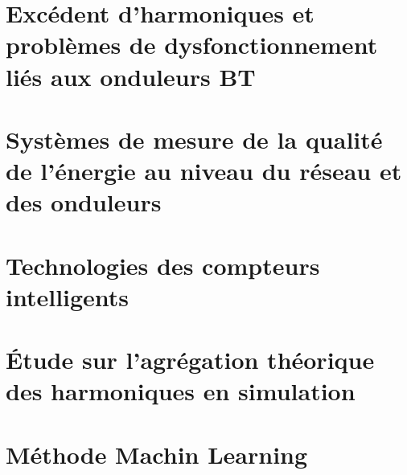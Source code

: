 \section{Excédent d'harmoniques et problèmes de dysfonctionnement liés aux onduleurs BT}



\section{Systèmes de mesure de la qualité de l'énergie au niveau du réseau et des onduleurs}



\section{Technologies des compteurs intelligents}



\section{Étude sur l'agrégation théorique des harmoniques en simulation}



\section{Méthode Machin Learning}